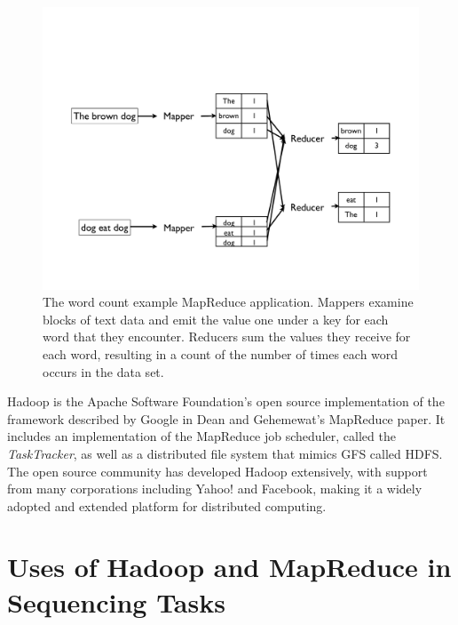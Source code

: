 \begin{figure}
\centering
\includegraphics[width=1\textwidth,trim=0in 1in 0in 3in,clip]{figures/mapreduce_example.pdf}
\caption{The word count example MapReduce application. Mappers examine blocks of text data and emit the value one under a key for each word that they encounter. Reducers sum the values they receive for each word, resulting in a count of the number of times each word occurs in the data set.}
\label{mapreduce_example}
\end{figure}

Hadoop is the Apache Software Foundation's open source implementation of the framework described by Google in Dean and Gehemewat's MapReduce paper. It includes an implementation of the MapReduce job scheduler, called the \emph{TaskTracker}, as well as a distributed file system that mimics GFS called HDFS. The open source community has developed Hadoop extensively, with support from many corporations including Yahoo! and Facebook, making it a widely adopted and extended platform for distributed computing.

\section{Uses of Hadoop and MapReduce in Sequencing Tasks}\label{section_mapred_related_work}

